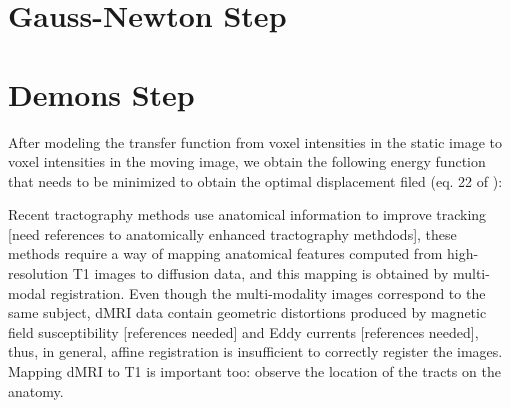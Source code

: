 \section{Gauss-Newton Step}

\section{Demons Step}
After modeling the transfer function from voxel intensities in the static image to voxel intensities in the moving image, we obtain the following energy function that needs to be minimized to obtain the optimal displacement filed (eq. 22 of \cite{Arce-santana2014}):


Recent tractography methods use anatomical information to improve tracking [need references to anatomically enhanced tractography methdods], these methods require a way of mapping
anatomical features computed from high-resolution T1 images to diffusion data, and this mapping is obtained by multi-modal registration. Even though the multi-modality images
correspond to the same subject, dMRI data contain geometric distortions produced by magnetic field susceptibility [references needed] and Eddy currents [references needed], thus,
in general, affine registration is insufficient to correctly register the images. Mapping dMRI to T1 is important too: observe the location of the tracts on the anatomy.
